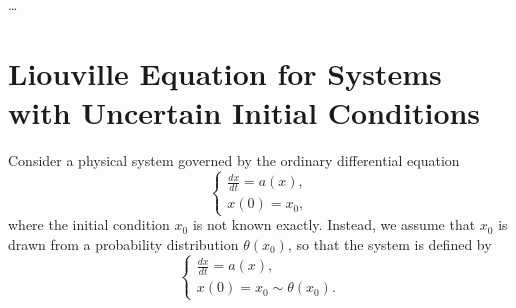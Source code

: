 \begin{exampleblock}[]
\begin{center}
    \begin{minipage}{0.4\textwidth}
    \end{minipage}
    \begin{minipage}{0.4\textwidth}    
    \end{minipage}
\end{center}

\dots

\end{exampleblock}


\newpage

\section{Liouville Equation for Systems with Uncertain Initial Conditions}

Consider a physical system governed by the ordinary differential equation
$$
\begin{cases}
\displaystyle \frac{dx}{dt} = a(x),\\[1mm]
x(0)=x_0,
\end{cases}
$$
where the initial condition $x_0$ is not known exactly. Instead, we assume that $x_0$ is drawn from a probability distribution $\theta(x_0)$, so that the system is defined by
$$
\begin{cases}
\displaystyle \frac{dx}{dt} = a(x),\\[1mm]
x(0)=x_0 \sim \theta(x_0).
\end{cases}
$$

